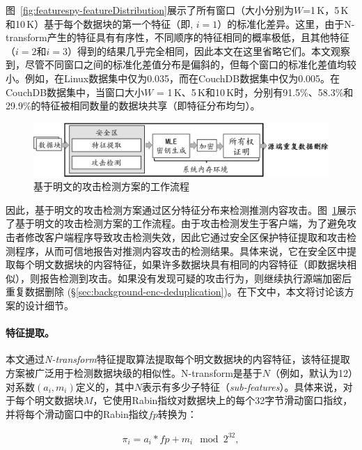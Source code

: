 图~\ref{fig:featurespy-featureDistribution}展示了所有窗口（大小分别为$W$=1\,K，5\,K和10\,K）基于每个数据块的第一个特征（即, $i = 1$）的标准化差异。这里，由于N-transform产生的特征具有有序性，不同顺序的特征相同的概率极低，且其他特征（$i = 2$和$i = 3$）得到的结果几乎完全相同，因此本文在这里省略它们。本文观察到，尽管不同窗口之间的标准化差值分布是偏斜的，但每个窗口的标准化差值均较小。例如，在Linux数据集中仅为0.035，而在CouchDB数据集中仅为0.005。在CouchDB数据集中，当窗口大小$W$ = 1\,K、5\,K和10\,K时，分别有91.5\%、58.3\%和29.9\%的特征被相同数量的数据块共享（即特征分布均匀）。

\begin{figure}
    \centering
    \includegraphics[width=\textwidth]{pic/featurespy/naive.pdf}
    \caption{基于明文的攻击检测方案的工作流程}
    \label{fig:featurespy-architecture-strawman}
\end{figure}

因此，基于明文的攻击检测方案通过区分特征分布来检测推测内容攻击。图~\ref{fig:featurespy-architecture-strawman}展示了基于明文的攻击检测方案的工作流程。由于攻击检测发生于客户端，为了避免攻击者修改客户端程序导致攻击检测失效，因此它通过安全区保护特征提取和攻击检测程序，从而可信地报告对推测内容攻击的检测结果。具体来说，它在安全区中提取每个明文数据块的内容特征，如果许多数据块具有相同的内容特征（即数据块相似），则报告检测到攻击。如果没有发现可疑的攻击行为，则继续执行源端加密后重复数据删除 (\S\ref{sec:background-enc-deduplication})。在下文中，本文将讨论该方案的设计细节。

\paragraph*{特征提取。}
本文通过{\em N-transform}\cite{shilane12}特征提取算法提取每个明文数据块的内容特征，该特征提取方案被广泛用于检测数据块级的相似性。N-transform是基于$N$（例如，默认为12）对系数$(a_i, m_i)$定义的，其中$N$表示有多少子特征（{\em sub-features}）。具体来说，对于每个明文数据块$M$，它使用Rabin指纹\cite{rabin81}对数据块上的每个32字节滑动窗口指纹，并将每个滑动窗口中的Rabin指纹$fp$转换为：

\begin{eqnarray}
  \label{eq:featurespy-feature}
  \pi_i = a_i * fp + m_i \mod 2^{32},
\end{eqnarray}


